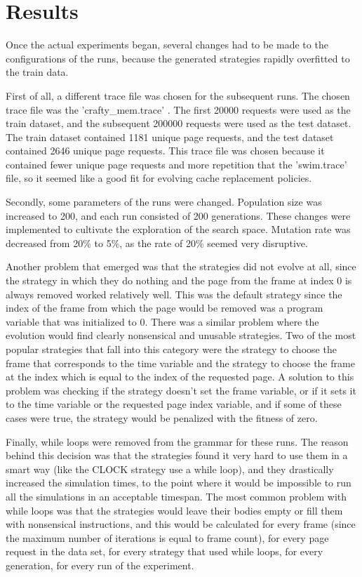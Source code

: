 \section{Results}
Once the actual experiments began, several changes had to be made to the configurations of the runs, because the generated strategies rapidly overfitted to the train data.

First of all, a different trace file was chosen for the subsequent runs. The chosen trace file was the 'crafty\_mem.trace' \citep{data}. The first 20000 requests were used as the train dataset, and the subsequent 200000 requests were used as the test dataset. The train dataset contained 1181 unique page requests, and the test dataset contained 2646 unique page requests. This trace file was chosen because it contained fewer unique page requests and more repetition that the 'swim.trace' file, so it seemed like a good fit for evolving cache replacement policies.

Secondly, some parameters of the runs were changed. Population size was increased to 200, and each run consisted of 200 generations. These changes were implemented to cultivate the exploration of the search space. Mutation rate was decreased from 20\% to 5\%, as the rate of 20\% seemed very disruptive.

Another problem that emerged was that the strategies did not evolve at all, since the strategy in which they do nothing and the page from the frame at index 0 is always removed worked relatively well. This was the default strategy since the index of the frame from which the page would be removed was a program variable that was initialized to 0. There was a similar problem where the evolution would find clearly nonsensical and unusable strategies. Two of the most popular strategies that fall into this category were the strategy to choose the frame that corresponds to the time variable and the strategy to choose the frame at the index which is equal to the index of the requested page. A solution to this problem was checking if the strategy doesn't set the frame variable, or if it sets it to the time variable or the requested page index variable, and if some of these cases were true, the strategy would be penalized with the fitness of zero.

Finally, while loops were removed from the grammar for these runs. The reason behind this decision was that the strategies found it very hard to use them in a smart way (like the CLOCK strategy use a while loop), and they drastically increased the simulation times, to the point where it would be impossible to run all the simulations in an acceptable timespan. The most common problem with while loops was that the strategies would leave their bodies empty or fill them with nonsensical instructions, and this would be calculated for every frame (since the maximum number of iterations is equal to frame count), for every page request in the data set, for every strategy that used while loops, for every generation, for every run of the experiment.

